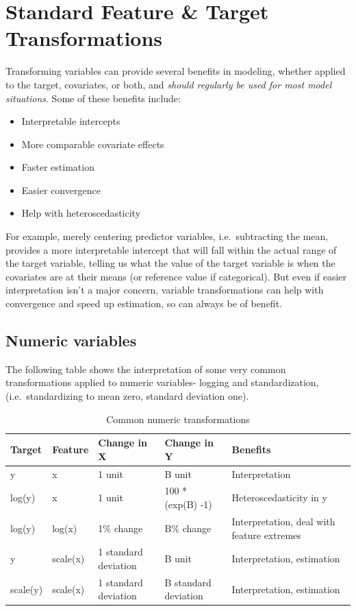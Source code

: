 \documentclass[
  letterpaper,
]{krantz}
\providecommand{\tightlist}{%
  \setlength{\itemsep}{0pt}\setlength{\parskip}{0pt}}\usepackage{longtable,booktabs,array}
\begin{document}
\section{Standard Feature \& Target
Transformations}\label{sec-data-transfromations}

Transforming variables can provide several benefits in modeling, whether
applied to the target, covariates, or both, and \emph{should regularly
be used for most model situations}. Some of these benefits include:

\begin{itemize}
\tightlist
\item
  Interpretable intercepts
\item
  More comparable covariate effects
\item
  Faster estimation
\item
  Easier convergence
\item
  Help with heteroscedasticity
\end{itemize}

For example, merely centering predictor variables, i.e.~subtracting the
mean, provides a more interpretable intercept that will fall within the
actual range of the target variable, telling us what the value of the
target variable is when the covariates are at their means (or reference
value if categorical). But even if easier interpretation isn't a major
concern, variable transformations can help with convergence and speed up
estimation, so can always be of benefit.

\subsection{Numeric variables}\label{numeric-variables}

The following table shows the interpretation of some very common
transformations applied to numeric variables- logging and
standardization, (i.e.~standardizing to mean zero, standard deviation
one).

\hypertarget{tbl-transformation}{}
\begin{longtable}{lllll}
\caption{\label{tbl-transformation}Common numeric transformations }\tabularnewline

\toprule
Target & Feature & Change in X & Change in Y & Benefits \\ 
\midrule\addlinespace[2.5pt]
y & x & 1 unit & B unit & Interpretation \\ 
log(y) & x & 1 unit & 100 * (exp(B) -1)  & Heteroscedasticity in y \\ 
log(y) & log(x) & 1\% change & B\% change & Interpretation, deal with feature extremes \\ 
y & scale(x) & 1 standard deviation & B unit & Interpretation, estimation \\ 
scale(y) & scale(x) & 1 standard deviation & B standard deviation & Interpretation, estimation \\ 
\bottomrule
\end{longtable}
\end{document}
